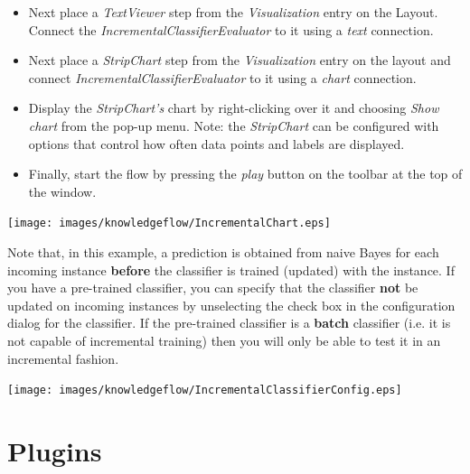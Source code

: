 \begin{itemize}
        \item Next place a \textit{TextViewer} step from the \textit{Visualization}
        entry on the Layout. Connect the \textit{IncrementalClassifierEvaluator} to
        it using a \textit{text} connection.

        \item Next place a \textit{StripChart} step from the \textit{Visualization}
        entry on the layout and connect \textit{IncrementalClassifierEvaluator} to it
        using a \textit{chart} connection.

        \item Display the \textit{StripChart's} chart by right-clicking over it and choosing
        \textit{Show chart} from the pop-up menu. Note: the \textit{StripChart} can be configured
        with options that control how often data points and labels are displayed.

        \item Finally, start the flow by pressing the \textit{play} button on the toolbar at the top of the window.        
\end{itemize}

\begin{center}
  \texttt{[image: images/knowledgeflow/IncrementalChart.eps]}
\end{center}

Note that, in this example, a prediction is obtained from naive Bayes
for each incoming instance {\bf before} the classifier is trained
(updated) with the instance. If you have a pre-trained classifier, you
can specify that the classifier {\bf not} be updated on incoming
instances by unselecting the check box in the configuration dialog for
the classifier. If the pre-trained classifier is a {\bf batch}
classifier (i.e. it is not capable of incremental training) then you
will only be able to test it in an incremental fashion.

\begin{center}
  \texttt{[image: images/knowledgeflow/IncrementalClassifierConfig.eps]}
\end{center}

\newpage
\section{Plugins}

